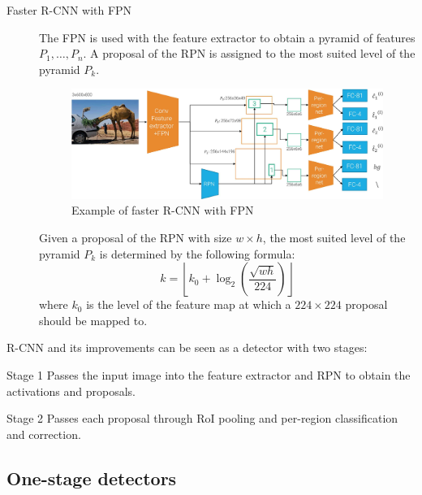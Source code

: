 \begin{description}
    \item[Faster R-CNN with FPN] 
        The FPN is used with the feature extractor to obtain a pyramid of features $P_1, \dots, P_n$. A proposal of the RPN is assigned to the most suited level of the pyramid $P_k$.

        \begin{figure}[H]
            \centering
            \includegraphics[width=0.8\linewidth]{./img/_faster_r_cnn_fpn.jpg}
            \caption{Example of faster R-CNN with FPN}
        \end{figure}

        \begin{remark}
            Given a proposal of the RPN with size $w \times h$, the most suited level of the pyramid $P_k$ is determined by the following formula:
            \[ k = \left\lfloor k_0 + \log_2\left(\frac{\sqrt{wh}}{224}\right) \right\rfloor \]
            where $k_0$ is the level of the feature map at which a $224 \times 224$ proposal should be mapped to.
        \end{remark}
\end{description}

\begin{remark}
    R-CNN and its improvements can be seen as a detector with two stages:
    \begin{descriptionlist}
        \item[Stage 1] 
            Passes the input image into the feature extractor and RPN to obtain the activations and proposals.
        \item[Stage 2] 
            Passes each proposal through RoI pooling and per-region classification and correction.
    \end{descriptionlist}
\end{remark}


\subsection{One-stage detectors}

